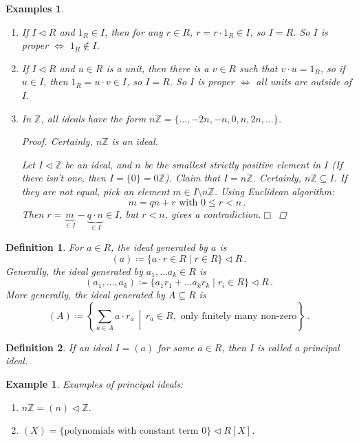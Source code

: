 \documentclass{article}
\theoremstyle{plain}\theoremheaderfont{\normalfont\itshape}\theorembodyfont{\rmfamily}\theoremseparator{.}\newtheorem*{rem}{Remark}\newtheorem*{ex}{Example}\newtheorem*{proof}{Proof}\newtheorem*{altp}{Alternative proof}\newtheorem*{nonex}{Non-Example}
\theoremstyle{plain}\theoremheaderfont{\normalfont\bfseries}\theorembodyfont{\rmfamily}\theoremseparator{.}\newtheorem{thm}{Theorem}[section]\newtheorem{lem}[thm]{Lemma}\newtheorem{prop}[thm]{Proposition}\newtheorem*{cor}{Corollary}\newtheorem{defn}[thm]{Definition}\newtheorem{clm}[thm]{Claim}\newtheorem{clminproof}{Claim}\newtheorem*{notn}{Notation}\newtheorem*{exer}{Exercise}\newtheorem*{lemnn}{Lemma}
\theoremstyle{break}\theoremheaderfont{\normalfont\itshape}\theorembodyfont{\rmfamily}\theoremseparator{.\medskip}\newtheorem*{proofskip}{Proof}\newtheorem*{exs}{Examples}\newtheorem*{rems}{Remarks}\newtheorem*{obs}{Observations}
\theoremstyle{break}\theoremheaderfont{\normalfont\bfseries}\theorembodyfont{\rmfamily}\theoremseparator{.\medskip}\newtheorem{lemskip}[thm]{Lemma}\newtheorem{defnskip}[thm]{Definition}\newtheorem{propskip}[thm]{Proposition}\newtheorem{thmskip}[thm]{Theorem}
\numberwithin{equation}{section}
\newcommand{\qed}{\hfill\ensuremath{\Box}}
\newcommand{\ZZ}{\mathbb{Z}}
\begin{document}
    \begin{exs}
        \begin{enumerate}[topsep=0pt,label=(\roman*)]
            \item If \(I\lhd R\) and \(1_R\in I\), then for any \(r\in R\), \(r=r\cdot 1_R\in I\), so \(I=R\). So \(I\) is proper \(\iff\) \(1_R\notin I\).
            \item If \(I\lhd R\) and \(u\in R\) is a unit, then there is a \(v\in R\) such that \(v\cdot u=1_R\), so if \(u\in I\), then \(1_R=u\cdot v\in I\), so \(I=R\). So \(I\) is proper \(\iff\) all units are outside of \(I\).
            \item In \(\ZZ\), all ideals have the form \(n\ZZ=\{\dots,-2n,-n,0,n,2n,\dots\}\).
          \begin{proof}
                Certainly, \(n\ZZ\) is an ideal.

                Let \(I\lhd\ZZ\) be an ideal, and \(n\) be the smallest strictly positive element in \(I\) (If there isn't one, then \(I=\{0\}=0\ZZ\)). Claim that \(I=n\ZZ\). Certainly, \(n\ZZ\subseteq I\). If they are not equal, pick an element \(m\in I\setminus n\ZZ\). Using Euclidean algorithm:
                \[m=qn+r\text{ with }0\le r<n\,.\]
                Then \(r=\underbrace{m}_{\in I}-\underbrace{q\cdot n}_{\in I}\in I\), but \(r<n\), gives a contradiction.\qed
            \end{proof}
        \end{enumerate}
    \end{exs}
    \begin{defn}
        For \(a\in R\), the ideal \textit{generated} by \(a\) is
        \[(a)\coloneqq\{a\cdot r\in R\mid r\in R\}\lhd R\,.\]
        Generally, the ideal generated by \(a_1,\dots a_k\in R\) is
        \[(a_1,\dots,a_k)\coloneqq\{a_1r_1+\dots a_kr_k\mid r_i\in R\}\lhd R\,.\]
        More generally, the ideal generated by \(A\subseteq R\) is
        \[(A)\coloneqq\left\{\sum_{a\in A}a\cdot r_a\,\middle|\, r_a\in R,\text{ only finitely many non-zero}\right\}\,.\]
    \end{defn}
    \begin{defn}
        If an ideal \(I=(a)\) for some \(a\in R\), then \(I\) is called a \textit{principal ideal}.
    \end{defn}
    \begin{ex}
        Examples of principal ideals:
        \begin{enumerate}[topsep=0pt,label=(\roman*)]
            \item \(n\ZZ=(n)\lhd\ZZ\).
            \item \((X)=\{\text{polynomials with constant term }0\}\lhd R[X]\).
        \end{enumerate}
    \end{ex}
\end{document}
